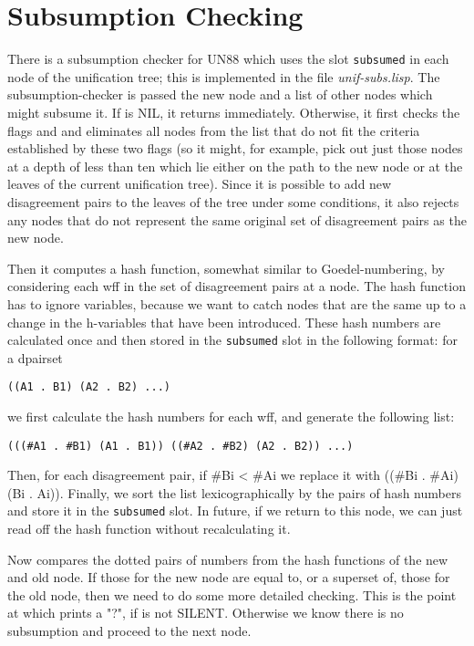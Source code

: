 \section{Subsumption Checking}
There is a subsumption checker for UN88 which uses the slot {\tt subsumed} in 
each node of the unification tree; this is implemented in the file {\it unif-subs.lisp}.
The subsumption-checker is passed the new node and a list of other nodes which 
might subsume it. If  is NIL, it returns immediately.
Otherwise, it first checks the flags  and 
and eliminates all nodes from the list that do not fit the criteria established by these two flags 
(so it might, for example, pick out just those nodes at a depth of less than ten which lie 
either on the path to the new node or at the leaves of the current unification tree). Since
it is possible to add new disagreement pairs to the leaves of the tree under some conditions,
it also rejects any nodes that do not represent the same original set of disagreement pairs
as the new node.

Then it computes a hash function, somewhat similar to Goedel-numbering, by considering each wff
in the set of disagreement pairs at a node. The hash function has to ignore variables, because
we want to catch nodes that are the same up to a change in the h-variables that have been introduced.
These hash numbers are calculated once and then stored
in the {\tt subsumed} slot in the following format: for a dpairset 
\begin{verbatim}
((A1 . B1) (A2 . B2) ...)
\end{verbatim}
we first calculate the hash numbers for each wff, and generate the following list:
\begin{verbatim}
(((#A1 . #B1) (A1 . B1)) ((#A2 . #B2) (A2 . B2)) ...)
\end{verbatim}
Then, for each disagreement pair, if \#Bi < \#Ai we replace it with ((\#Bi . \#Ai) (Bi . Ai)).
Finally, we sort the list lexicographically by the pairs of hash numbers and store it in the
{\tt subsumed} slot. In future, if we return to this node, we can just read off the hash
function without recalculating it.

Now \TPS compares the dotted pairs of numbers from the hash functions of the new and old node.
If those for the new node are equal to, or a superset of, those for the old node, then we need
to do some more detailed checking. This is the point at which \TPS prints a "?", if 
is not SILENT. Otherwise we know there is no subsumption and proceed to the next node.

